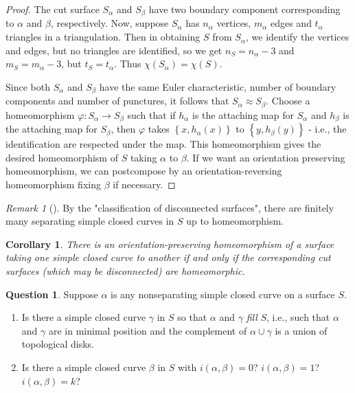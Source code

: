 \documentclass[reqno]{amsart}
\newtheorem{corollary}[theorem]{Corollary}
\theoremstyle{definition}
\newtheorem{question}[theorem]{Question}
\theoremstyle{remark}
\newtheorem*{remark}{Remark}
\begin{document}
\begin{proof}
    The cut surface $S_{\alpha}$ and $S_{\beta}$ have
    two boundary component corresponding to $\alpha$ and 
    $\beta$, respectively. 
    Now, suppose $S_{\alpha}$ has
    $n_{\alpha}$ vertices, $m_{\alpha}$ edges and
    $t_{\alpha}$ triangles in a triangulation. Then
    in obtaining $S$ from $S_{\alpha}$, we identify the vertices
    and edges, but no triangles are identified, so we get
    $n_{S} = n_{\alpha}-3$ and $m_{S} = m_{\alpha}-3$, but
    $t_{S} = t_{\alpha}$. Thus $\chi (S_{\alpha}) = 
    \chi (S)$.

    Since both $S_{\alpha}$ and
    $S_{\beta}$ have the same Euler characteristic, number of
    boundary components and number of punctures, it follows
    that $S_{\alpha} \approx S_{\beta}$. Choose
    a homeomorphism $\varphi \colon S_{\alpha} \to S_{\beta}$ such 
    that if $h_{\alpha}$ is the attaching map for $S_{\alpha}$ 
    and $h_{\beta}$ is the attaching map for $S_{\beta}$,
    then $\varphi$ takes $\left\{ x, h_{\alpha}(x) \right\} $ 
    to $\left\{ y, h_{\beta}(y) \right\} $ - i.e., the
    identification are respected under the map.
    This homeomorphism gives the desired
    homeomorphism of $S$ taking $\alpha$ to $\beta$.
    If we want an orientation preserving homeomorphism, we
    can postcompose by an orientation-reversing homeomorphism
    fixing $\beta$ if necessary.
\end{proof}


\begin{remark}[]
    By the "classification of disconnected surfaces", there
    are finitely many separating simple closed curves in $S$ 
    up to homeomorphism.
\end{remark}


\begin{corollary}\label{cut-surface-homeo-1}
    There is an orientation-preserving homeomorphism of a surface
    taking one simple closed curve to another if and only
    if the corresponding cut surfaces (which may be disconnected)
    are homeomorphic.
\end{corollary}



\begin{question}
    Suppose $\alpha$ is any nonseparating simple closed curve
    on a surface $S$.
    \begin{enumerate}
        \item Is there a simple closed curve
            $\gamma$ in $S$ so that $\alpha$ and $\gamma$ 
            \textit{fill} $S$, i.e., such that
            $\alpha$ and $\gamma$ are in minimal position
            and the complement of $\alpha \cup  \gamma$ is
            a union of topological disks.
        \item Is there a simple closed curve $\beta$ in
            $S$ with $i(\alpha,\beta) = 0$? $i(\alpha,\beta)=1$?
            $i(\alpha,\beta)=k$?
    \end{enumerate}
\end{question}
\end{document}
